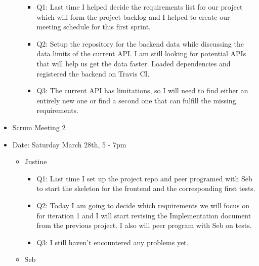 \documentclass[]{article}
\begin{document}
\begin{itemize}
\begin{itemize}
    \begin{itemize}
    \itemsep1pt\parskip0pt
    \item
      Q1: Last time I helped decide the requirements list for our
      project which will form the project backlog and I helped to create
      our meeting schedule for this first sprint.
    \item
      Q2: Setup the repository for the backend data while discussing the
      data limits of the current API. I am still looking for potential
      APIs that will help us get the data faster. Loaded dependencies
      and registered the backend on Travis CI.
    \item
      Q3: The current API has limitations, so I will need to find either
      an entirely new one or find a second one that can fulfill the
      missing requirements.
    \end{itemize}
  \end{itemize}
\item
  Scrum Meeting 2
\item
  Date: Saturday March 28th, 5 - 7pm

  \begin{itemize}
  \itemsep1pt\parskip0pt
  \item
    Justine

    \begin{itemize}
    \itemsep1pt\parskip0pt
    \item
      Q1: Last time I set up the project repo and peer programed with
      Seb to start the skeleton for the frontend and the corresponding
      first tests.
    \item
      Q2: Today I am going to decide which requirements we will focus on
      for iteration 1 and I will start revising the Implementation
      document from the previous project. I also will peer program with
      Seb on tests.
    \item
      Q3: I still haven't encountered any problems yet.
    \end{itemize}
  \item
    Seb


\end{itemize}
\end{itemize}
\end{document}
